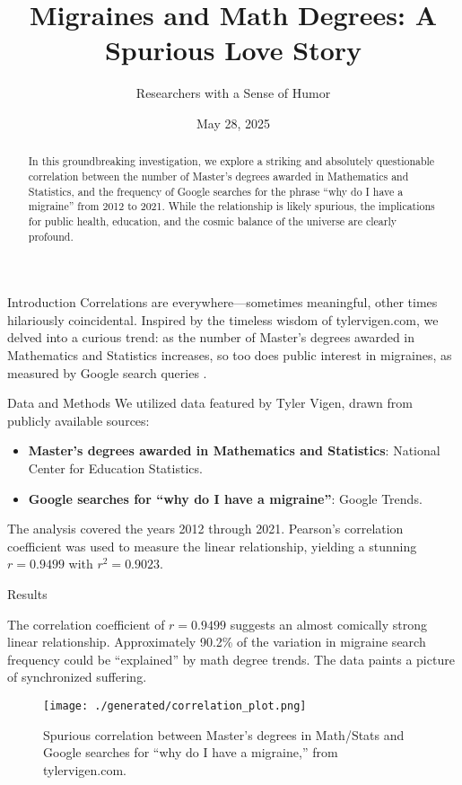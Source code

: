 \documentclass{article}
\title{\textbf{Migraines and Math Degrees: A Spurious Love Story}}
\author{Researchers with a Sense of Humor}
\date{May 28, 2025}
\begin{document}
\maketitle

\begin{abstract}
  In this groundbreaking investigation, we explore a striking and absolutely questionable correlation between the number of Master's degrees awarded in Mathematics and Statistics, and the frequency of Google searches for the phrase ``why do I have a migraine'' from 2012 to 2021. While the relationship is likely spurious, the implications for public health, education, and the cosmic balance of the universe are clearly profound.
\end{abstract}

\begin{section}{Introduction}
 Correlations are everywhere---sometimes meaningful, other times hilariously coincidental. Inspired by the timeless wisdom of tylervigen.com, we delved into a curious trend: as the number of Master's degrees awarded in Mathematics and Statistics increases, so too does public interest in migraines, as measured by Google search queries \cite{vigen_migraine}.
\end{section}

\begin{section}{Data and Methods}
 We utilized data featured by Tyler Vigen, drawn from publicly available sources:
 \begin{itemize}
   \item \textbf{Master's degrees awarded in Mathematics and Statistics}: National Center for Education Statistics.
   \item \textbf{Google searches for ``why do I have a migraine''}: Google Trends.
 \end{itemize}
 The analysis covered the years 2012 through 2021. Pearson's correlation coefficient was used to measure the linear relationship, yielding a stunning $r = 0.9499$ with $r^2 = 0.9023$.
\end{section}

\begin{section}{Results}



 The correlation coefficient of $r = 0.9499$ suggests an almost comically strong linear relationship. Approximately 90.2\% of the variation in migraine search frequency could be ``explained'' by math degree trends. The data paints a picture of synchronized suffering.

 \begin{figure}[H]
   \centering
   \texttt{[image: ./generated/correlation\_plot.png]}
   \caption{Spurious correlation between Master's degrees in Math/Stats and Google searches for ``why do I have a migraine,'' from tylervigen.com.}
   \label{fig:correlation}
 \end{figure}

 

\end{section}
\end{document}
